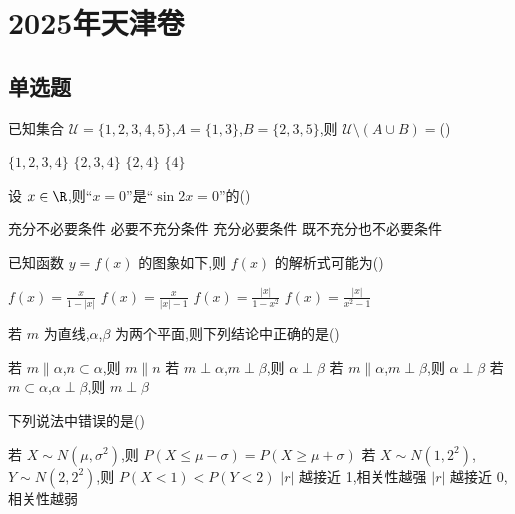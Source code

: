 \chapter{2025年天津卷}

\section{单选题}

\begin{problem}
已知集合 \(\mathcal U=\{1,2,3,4,5\}\),\(A=\{1,3\}\),\(B=\{2,3,5\}\),则 \(\mathcal U\setminus(A\cup B)=\)(\quad)

\choices
    {\(\{1,2,3,4\}\)}
    {\(\{2,3,4\}\)}
    {\(\{2,4\}\)}
    {\(\{4\}\)}
\end{problem}

\begin{problem}
设 \(x\in\R\),则``\(x=0\)''是``\(\sin 2x=0\)''的(\quad)

\choices
    {充分不必要条件}
    {必要不充分条件}
    {充分必要条件}
    {既不充分也不必要条件}
\end{problem}

\begin{problem}
已知函数 \(y=f(x)\) 的图象如下,则 \(f(x)\) 的解析式可能为(\quad)


\choices
    {\(f(x)=\frac{x}{1-|x|}\)}
    {\(f(x)=\frac{x}{|x|-1}\)}
    {\(f(x)=\frac{|x|}{1-x^2}\)}
    {\(f(x)=\frac{|x|}{x^2-1}\)}
\end{problem}

\begin{problem}
若 \(m\) 为直线,\(\alpha\),\(\beta\) 为两个平面,则下列结论中正确的是(\quad)

\choices
    {若 \(m\parallel \alpha\),\(n\subset \alpha\),则 \(m\parallel n\)}
    {若 \(m\perp\alpha\),\(m\perp\beta\),则 \(\alpha\perp\beta\)}
    {若 \(m\parallel\alpha\),\(m\perp\beta\),则 \(\alpha\perp\beta\)}
    {若 \(m\subset\alpha\),\(\alpha\perp\beta\),则 \(m\perp\beta\)}
\end{problem}

\begin{problem}
下列说法中错误的是(\quad)

\choices
    {若 \(X\sim N(\mu,\sigma^2)\),则 \(P(X\le\mu-\sigma)=P(X\ge\mu+\sigma)\)}
    {若 \(X\sim N(1,2^2)\),\(Y\sim N(2,2^2)\),则 \(P(X<1)<P(Y<2)\)}
    {\(|r|\) 越接近 1,相关性越强}
    {\(|r|\) 越接近 0,相关性越弱}
\end{problem}

